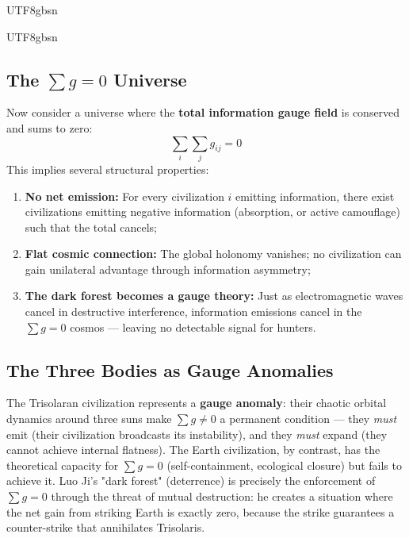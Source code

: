 \documentclass[11pt,a4paper]{article}
\begin{document}
\begin{CJK}{UTF8}{gbsn}
{\begin{CJK}{UTF8}{gbsn}
\subsection{The $\sum g = 0$ Universe}
Now consider a universe where the \textbf{total information gauge field} is conserved
and sums to zero:
\begin{equation}
    \boxed{\sum_i \sum_j g_{ij} = 0}
\end{equation}
This implies several structural properties:
\begin{enumerate}[label=(\alph*)]
    \item \textbf{No net emission:} For every civilization $i$ emitting information,
          there exist civilizations emitting negative information (absorption, or
          active camouflage) such that the total cancels;
    \item \textbf{Flat cosmic connection:} The global holonomy vanishes; no
          civilization can gain unilateral advantage through information asymmetry;
    \item \textbf{The dark forest becomes a gauge theory:} Just as electromagnetic
          waves cancel in destructive interference, information emissions cancel
          in the $\sum g = 0$ cosmos --- leaving no detectable signal for hunters.
\end{enumerate}
\subsection{The Three Bodies as Gauge Anomalies}
The Trisolaran civilization represents a \textbf{gauge anomaly}: their chaotic orbital
dynamics around three suns make $\sum g \neq 0$ a permanent condition --- they \textit{must}
emit (their civilization broadcasts its instability), and they \textit{must} expand
(they cannot achieve internal flatness). The Earth civilization, by contrast, has
the theoretical capacity for $\sum g = 0$ (self-containment, ecological closure) but
fails to achieve it.
Luo Ji's "dark forest" (deterrence) is precisely the enforcement of $\sum g = 0$
through the threat of mutual destruction: he creates a situation where the net gain
from striking Earth is exactly zero, because the strike guarantees a counter-strike
that annihilates Trisolaris.

\end{CJK}}
\end{CJK}
\end{document}
